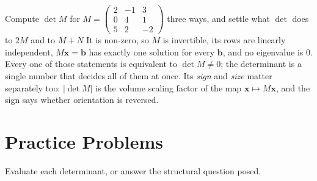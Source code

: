 \begin{worked}{Compute $\det M$ for $M=\begin{pmatrix}2&-1&3\\0&4&1\\5&2&-2\end{pmatrix}$ three ways, and settle what $\det$ does to $2M$ and to $M+N$}
It is non-zero, so $M$ is invertible, its rows are linearly independent,
$M\mathbf x=\mathbf b$ has exactly one solution for every $\mathbf b$, and
no eigenvalue is $0$. Every one of those statements is equivalent to
$\det M\neq0$; the determinant is a single number that decides all of them
at once. Its \emph{sign} and \emph{size} matter separately too: $|\det M|$
is the volume scaling factor of the map $\mathbf x\mapsto M\mathbf x$, and
the sign says whether orientation is reversed.
\end{worked}

\section{Practice Problems}

Evaluate each determinant, or answer the structural question posed.

